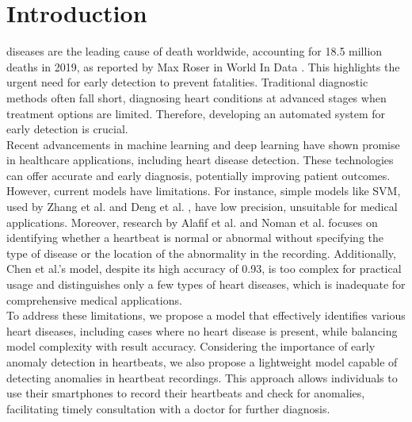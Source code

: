 \vfill
\section{Introduction}
 diseases are the leading cause of death worldwide, accounting for 18.5 million deaths in 2019, as reported
by Max Roser in World In Data \citeyear{owid-causes-of-death-treemap} \cite{owid-causes-of-death-treemap}.
This highlights the urgent need for early detection to prevent fatalities. Traditional diagnostic methods often fall short,
diagnosing heart conditions at advanced stages when treatment options are limited. Therefore, developing an automated system for early detection is crucial.\\
Recent advancements in machine learning and deep learning have shown promise in healthcare applications, including heart disease detection.
These technologies can offer accurate and early diagnosis, potentially improving patient outcomes. However, current models have limitations.
For instance, simple models like SVM, used by Zhang et al. \cite{Zhang_Han_Deng_2017} and Deng et al. \cite{Deng_Han_2016}, have low precision,
unsuitable for medical applications. Moreover, research by Alafif et al. \cite{Alafif_Boulares_Barnawi_Alafif_Althobaiti_Alferaidi_2020}
and Noman et al. \cite{Noman_Ting_Salleh_Ombao_2019} focuses on identifying whether a heartbeat is normal or abnormal without specifying the
type of disease or the location of the abnormality in the recording. Additionally, Chen et al.'s \cite{Chen_Ren_Hao_Hu_2018} model, despite its high accuracy of 0.93,
is too complex for practical usage and distinguishes only a few types of heart diseases, which is inadequate for comprehensive medical applications.\\
To address these limitations, we propose a model that effectively identifies various heart diseases, including cases where no heart disease is present,
while balancing model complexity with result accuracy. Considering the importance of early anomaly detection in heartbeats, we also propose a lightweight
model capable of detecting anomalies in heartbeat recordings. This approach allows individuals to use their smartphones to record their heartbeats and check for anomalies,
facilitating timely consultation with a doctor for further diagnosis.



